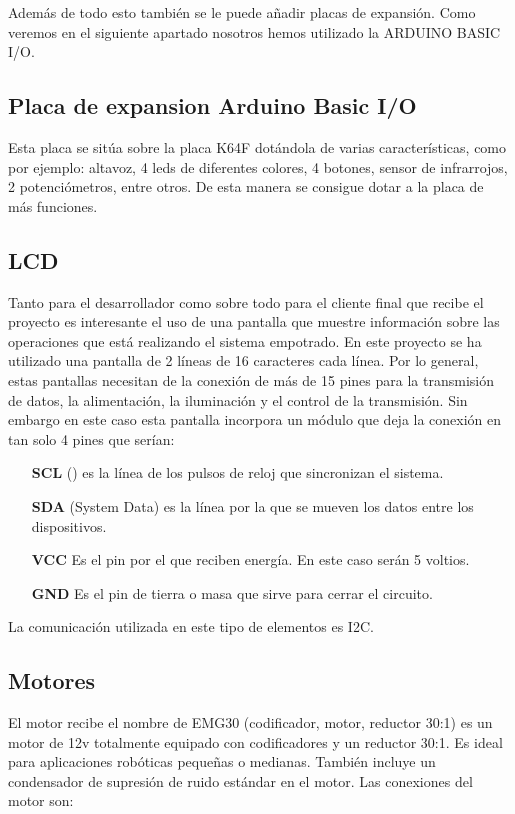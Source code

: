 Además de todo esto también se le puede añadir placas de expansión. Como veremos en el siguiente apartado nosotros hemos utilizado la ARDUINO BASIC I/O.

\subsection{Placa de expansion Arduino Basic I/O}

Esta placa se sitúa sobre la placa K64F dotándola de varias características, como por ejemplo:
altavoz, 4 leds de diferentes colores, 4 botones, sensor de infrarrojos, 2 potenciómetros, entre otros. De esta manera se consigue dotar a la placa de más funciones.

\subsection{LCD}
Tanto para el desarrollador como sobre todo para el cliente final que recibe el proyecto es interesante el uso de una pantalla que muestre información sobre las operaciones que está realizando el sistema empotrado. En este proyecto se ha utilizado una pantalla de 2 líneas de 16 caracteres cada línea. Por lo general, estas pantallas necesitan de la conexión de más de 15 pines para la transmisión de datos, la alimentación, la iluminación y el control de la transmisión. Sin embargo en este caso esta pantalla incorpora un módulo que deja la conexión en tan solo 4 pines que serían:
\begin{itemize}
\item[\textbf{SCL}] () es la línea de los pulsos de reloj que sincronizan el sistema. 
\item[\textbf{SDA}] (System Data) es la línea por la que se mueven los datos entre los dispositivos.
\item[\textbf{VCC}] Es el pin por el que reciben energía. En este caso serán 5 voltios.
\item[\textbf{GND}] Es el pin de tierra o masa que sirve para cerrar el circuito.
\end{itemize}
La comunicación utilizada en este tipo de elementos es I2C.


\subsection{Motores}   
El motor recibe el nombre de EMG30 (codificador, motor, reductor 30:1) es un motor de 12v totalmente equipado con codificadores y un reductor 30:1. Es ideal para aplicaciones robóticas pequeñas o medianas. También incluye un condensador de supresión de ruido estándar en el motor. Las conexiones del motor son:

